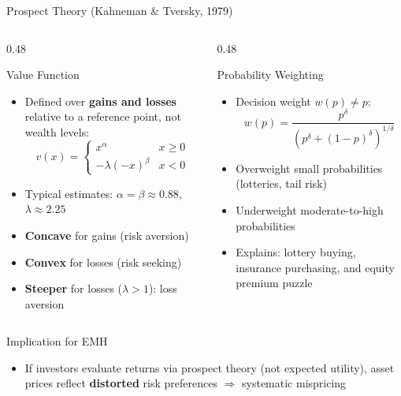 \documentclass[9pt, aspectratio=169, t]{beamer}
\theoremstyle{definition}
\newenvironment{cminipage}[1]{%
    \par\noindent\hfill\begin{minipage}{#1}\ignorespaces
}{%
    \end{minipage}\hfill\null\par
}
\begin{document}
\begin{frame}{Prospect Theory (Kahneman \& Tversky, 1979)}
\begin{cminipage}{0.95\textwidth}
\small
\begin{columns}[T]
\begin{column}{0.48\textwidth}
\begin{block}{Value Function}
\begin{itemize}\setlength{\itemsep}{0pt}
    \item Defined over \textbf{gains and losses} relative to a reference point, not wealth levels:
    $$v(x) = \begin{cases} x^\alpha & x \geq 0 \\ -\lambda(-x)^\beta & x < 0 \end{cases}$$
    \item Typical estimates: $\alpha = \beta \approx 0.88$, $\lambda \approx 2.25$
    \item \textbf{Concave} for gains (risk aversion)
    \item \textbf{Convex} for losses (risk seeking)
    \item \textbf{Steeper} for losses ($\lambda > 1$): loss aversion
\end{itemize}
\end{block}
\end{column}
\begin{column}{0.48\textwidth}
\begin{block}{Probability Weighting}
\begin{itemize}\setlength{\itemsep}{0pt}
    \item Decision weight $w(p) \neq p$:
    $$w(p) = \frac{p^\delta}{(p^\delta + (1-p)^\delta)^{1/\delta}}$$
    \item Overweight small probabilities (lotteries, tail risk)
    \item Underweight moderate-to-high probabilities
    \item Explains: lottery buying, insurance purchasing, and equity premium puzzle
\end{itemize}
\end{block}
\end{column}
\end{columns}

\vspace{0.1cm}
\begin{alertblock}{Implication for EMH}
\begin{itemize}\setlength{\itemsep}{0pt}
    \item If investors evaluate returns via prospect theory (not expected utility), asset prices reflect \textbf{distorted} risk preferences $\Rightarrow$ systematic mispricing
\end{itemize}
\end{alertblock}
\end{cminipage}
\end{frame}
\end{document}
